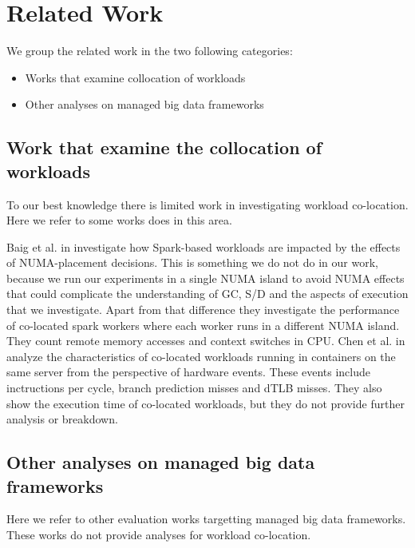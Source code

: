 \section{Related Work}

We group the related work in the two following categories:
\begin{itemize}
\item{Works that examine collocation of workloads}
\item{Other analyses on managed big data frameworks}
\end{itemize}

\subsection{Work that examine the collocation of workloads}
To our best knowledge there is limited work in investigating workload co-location. Here we refer to some works does in this area.


Baig et al. in \cite{NUMA} investigate how Spark-based workloads are impacted by the effects of NUMA-placement decisions. This is something we do not do in our work, because we run our experiments in a single NUMA island to avoid NUMA effects that could complicate the understanding of GC, S/D and the aspects of execution that we investigate. Apart from that difference they investigate the performance of co-located spark workers where each worker runs in a different NUMA island. They count remote memory accesses and context switches in CPU. Chen et al. in \cite{interference} analyze the characteristics of co-located workloads running in containers on the same server from the perspective of hardware events. These events include inctructions per cycle, branch prediction misses and dTLB misses. They also show the execution time of co-located workloads, but they do not provide further analysis or breakdown.

\subsection{Other analyses on managed big data frameworks}

Here we refer to other evaluation works targetting managed big data frameworks.
These works do not provide analyses for workload co-location.

